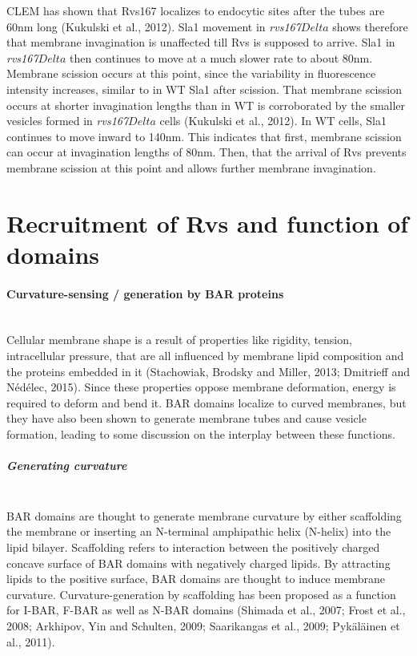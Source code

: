 \vspace{5mm}
CLEM has shown that Rvs167 localizes to endocytic sites after the tubes are 60nm long (Kukulski et al., 2012). Sla1 movement in \textit{rvs167$Delta$} shows therefore that membrane invagination is unaffected till Rvs is supposed to arrive. Sla1 in \textit{rvs167$Delta$} then continues to move at a much slower rate to about 80nm. Membrane scission occurs at this point, since the variability in fluorescence intensity increases, similar to in WT Sla1 after scission. That membrane scission occurs at shorter invagination lengths than in WT is corroborated by the smaller vesicles formed in \textit{rvs167$Delta$} cells (Kukulski et al., 2012). In WT cells, Sla1 continues to move inward to 140nm. This indicates that first, membrane scission can occur at invagination lengths of 80nm. Then, that the arrival of Rvs prevents membrane scission at this point and allows further membrane invagination. 





\section{Recruitment of Rvs and function of domains} 

	\paragraph{Curvature-sensing / generation by BAR proteins }
					\mbox{}\\
Cellular membrane shape is a result of properties like rigidity, tension, intracellular pressure, that are all influenced by membrane lipid composition and the proteins embedded in it (Stachowiak, Brodsky and Miller, 2013; Dmitrieff and Nédélec, 2015). Since these properties oppose membrane deformation, energy is required to deform and bend it. BAR domains localize to curved membranes, but they have also been shown to generate membrane tubes and cause vesicle formation, leading to some discussion on the interplay between these functions. 


	\vspace{5mm}
			
				\subparagraph{Generating curvature }
				\mbox{}\\
BAR domains are thought to generate membrane curvature by either scaffolding the membrane or inserting an N-terminal amphipathic helix (N-helix) into the lipid bilayer. 
Scaffolding refers to interaction between the positively charged concave surface of BAR domains with negatively charged lipids. By attracting lipids to the positive surface, BAR domains are thought to induce membrane curvature. Curvature-generation by scaffolding has been proposed as a function for I-BAR, F-BAR as well as N-BAR domains (Shimada et al., 2007; Frost et al., 2008; Arkhipov, Yin and Schulten, 2009; Saarikangas et al., 2009; Pykäläinen et al., 2011). 
	\vspace{5mm}
	
